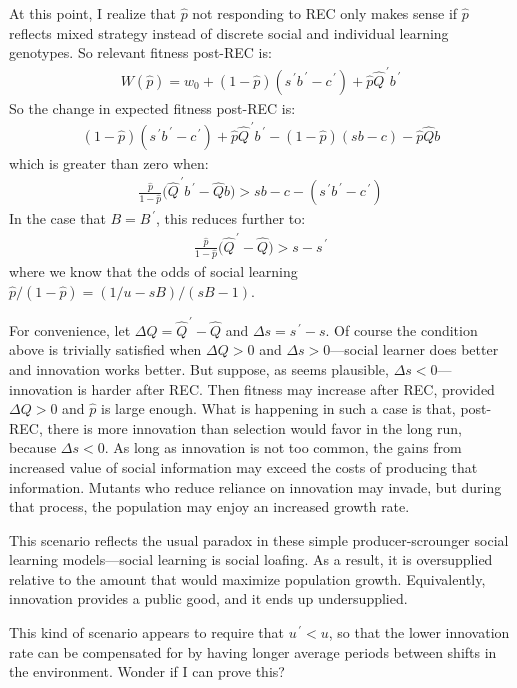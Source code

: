 \documentclass[reqno,12pt]{amsart}
\newcommand{\pp}{^{\,\prime}}
\begin{document}
At this point, I realize that $\hat p$ not responding to REC only makes sense if $\hat p$ reflects mixed strategy instead of discrete social and individual learning genotypes. So relevant fitness post-REC is:
\begin{align}
	W(\hat p) = w_0 + (1-\hat p) ( s\pp b\pp - c\pp ) + \hat p \hat Q\pp b\pp
\end{align}
So the change in expected fitness post-REC is:
\begin{align}
	(1-\hat p) ( s\pp b\pp - c\pp ) + \hat p \hat Q\pp b\pp - (1-\hat p) ( s b - c ) - \hat p \hat Q b
\end{align}
which is greater than zero when:
\begin{align*}
	\frac{\hat p}{1-\hat p} \big( \hat Q\pp b\pp - \hat Q b \big ) > s b - c - ( s\pp b\pp - c\pp )
\end{align*}
In the case that $B = B\pp$, this reduces further to:
\begin{align}
	\frac{\hat p}{1-\hat p} \big( \hat Q\pp  - \hat Q  \big ) > s -  s\pp
\end{align}
where we know that the odds of social learning $\hat p / (1-\hat p) = (1/u - sB)/(sB-1)$.

For convenience, let $\Delta Q = \hat Q\pp - \hat Q$ and $\Delta s = s\pp - s$. Of course the condition above is trivially satisfied when $\Delta Q > 0$ and $\Delta s > 0$---social learner does better and innovation works better. But suppose, as seems plausible, $\Delta s < 0$---innovation is harder after REC. Then fitness may increase after REC, provided $\Delta Q > 0$ and $\hat p$ is large enough. What is happening in such a case is that, post-REC, there is more innovation than selection would favor in the long run, because $\Delta s < 0$. As long as innovation is not too common, the gains from increased value of social information may exceed the costs of producing that information. Mutants who reduce reliance on innovation may invade, but during that process, the population may enjoy an increased growth rate.

This scenario reflects the usual paradox in these simple producer-scrounger social learning models---social learning is social loafing. As a result, it is oversupplied relative to the amount that would maximize population growth. Equivalently, innovation provides a public good, and it ends up undersupplied.

This kind of scenario appears to require that $u\pp < u$, so that the lower innovation rate can be compensated for by having longer average periods between shifts in the environment. Wonder if I can prove this?

% 
%
%
\end{document}
